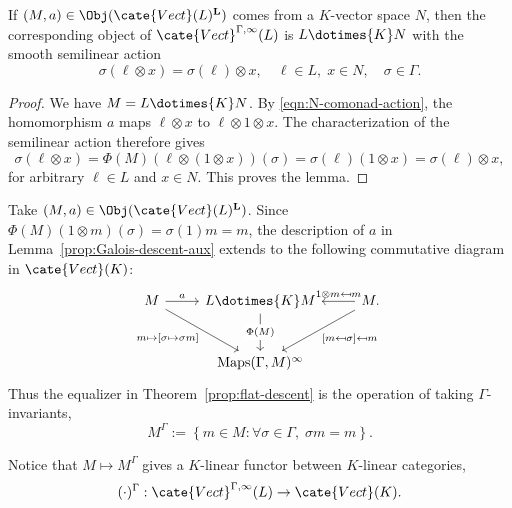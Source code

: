 \begin{lemma}\label{prop:Galois-descent-action}
	If $(M,a)\in\Obj(\cate{Vect}(L)^{\mathbf{L}})$ comes from a $K$-vector
	space $N$, then the corresponding object of
	$\cate{Vect}^{\Gamma,\infty}(L)$ is $L\dotimes{K}N$ with the smooth
	semilinear action
	\[ \sigma (\ell \otimes x) = \sigma(\ell) \otimes x, \quad \ell \in L, \; x \in N, \quad \sigma \in \Gamma. \]
\end{lemma}
\begin{proof}
	We have $M=L\dotimes{K}N$. By \eqref{eqn:N-comonad-action}, the
	homomorphism $a$ maps $\ell\otimes x$ to $\ell\otimes1\otimes x$. The
	characterization of the semilinear action therefore gives
	\[ \sigma (\ell \otimes x) = \Phi(M)(\ell \otimes (1 \otimes x))(\sigma) = \sigma(\ell) (1 \otimes x) = \sigma(\ell) \otimes x, \]
	for arbitrary $\ell\in L$ and $x\in N$. This proves the lemma.
\end{proof}

Take $(M,a)\in\Obj(\cate{Vect}(L)^{\mathbf{L}})$. Since
$\Phi(M)(1\otimes m)(\sigma)=\sigma(1)m=m$, the description of $a$ in
Lemma~\ref{prop:Galois-descent-aux} extends to the following commutative
diagram in $\cate{Vect}(K)$:
\[\begin{tikzcd}[row sep=large]
	M \arrow[r, "a"] \arrow[rd, "{m \mapsto [\sigma \mapsto \sigma m]}"'] & L \dotimes{K} M \arrow[d, "\Phi(M)" description] & M. \arrow[l, "{1 \otimes m \mapsfrom m}"'] \arrow[ld, "{[m \mapsfrom \sigma] \mapsfrom m}"] \\
	& \mathrm{Maps}(\Gamma, M)^\infty &
\end{tikzcd}\]
Thus the equalizer in Theorem~\ref{prop:flat-descent} is the operation of
taking $\Gamma$-invariants,
\[ M^\Gamma := \left\{ m \in M: \forall \sigma \in \Gamma, \; \sigma m = m \right\}. \]

Notice that $M\mapsto M^\Gamma$ gives a $K$-linear functor between
$K$-linear categories,
\[ (\cdot)^{\Gamma}: \cate{Vect}^{\Gamma, \infty}(L) \to \cate{Vect}(K). \]

